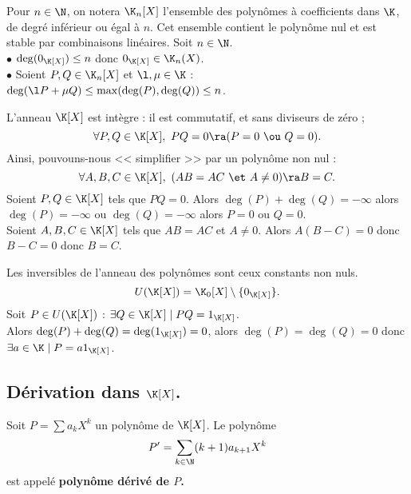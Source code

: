 \documentclass[11pt]{article}
\begin{document}
\pagebreak

\begin{corr}{}{}
    Pour $n\in\N$, on notera $\K_n[X]$ l'ensemble des polynômes à coefficients dans $\K$, de degré inférieur ou égal à $n$. Cet ensemble contient le polynôme nul et est stable par combinaisons linéaires.
    \tcblower
    Soit $n\in\N$.\\
    $\bullet$ $\deg(0_{\K[X]})\leq n$ donc $0_{\K[X]}\in\K_n(X)$.\\
    $\bullet$ Soient $P,Q\in\K_n[X]$ et $\l,\mu\in\K$ : $\deg(\l P + \mu Q) \leq \max(\deg(P),\deg(Q))\leq n$.
\end{corr}

\begin{corr}{}{}
    L'anneau $\K[X]$ est intègre : il est commutatif, et sans diviseurs de zéro ;
    \begin{equation*}
        \forall P,Q\in\K[X], ~ PQ=0 \ra (P=0 ~\ou~ Q=0).
    \end{equation*}
    Ainsi, pouvouns-nous << simplifier >> par un polynôme non nul :
    \begin{equation*}
        \forall A,B,C\in\K[X], ~ (AB=AC ~\et~ A\neq0) \ra B=C.
    \end{equation*}
    \tcblower
    Soient $P,Q\in\K[X]$ tels que $PQ=0$. Alors $\deg(P)+\deg(Q)=-\infty$ alors $\deg(P)=-\infty$ ou $\deg(Q)=-\infty$ alors $P=0$ ou $Q=0$.\\
    Soient $A,B,C\in\K[X]$ tels que $AB=AC$ et $A\neq0$. Alors $A(B-C)=0$ donc $B-C=0$ donc $B=C$.
\end{corr}

\begin{corr}{Les inversibles de l'anneau des polynômes sont ceux constants non nuls.}{}
    \begin{equation*}
        U(\K[X])=\K_0[X]\setminus\{0_{\K[X]}\}.
    \end{equation*}
    \tcblower
    Soit $P\in U(\K[X])$ : $\exists Q \in \K[X] \mid PQ=1_{\K[X]}$.\\
    Alors $\deg(P)+\deg(Q)=\deg(1_{\K[X]})=0$, alors $\deg(P)=\deg(Q)=0$ donc $\exists a \in \K \mid P=a1_{\K[X]}$.
\end{corr}

\subsection{Dérivation dans \texorpdfstring{$\K[X]$}{Lg}.}

\begin{defi}{}{}
    Soit $P=\sum a_kX^k$ un polynôme de $\K[X]$. Le polynôme
    \begin{equation*}
        P'=\sum_{k\in\N}(k+1)a_{k+1}X^k
    \end{equation*}
    est appelé \bf{polynôme dérivé} de $P$.
\end{defi}
\end{document}
